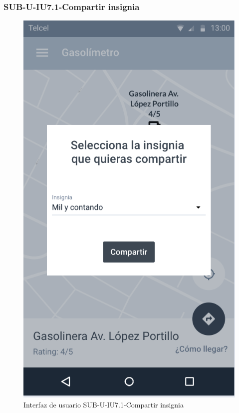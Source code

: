 \subsubsection{SUB-U-IU7.1-Compartir insignia}\label{SUB-U-IU7.1}
\begin{figure}[H]
	\centering
	\includegraphics[scale=.55]{Capitulo4/software/submodulos/usuarios/images/sub-u-iu7_1}
	\caption{Interfaz de usuario SUB-U-IU7.1-Compartir insignia}
	\label{fig:sub-u-iu7.1}
\end{figure}